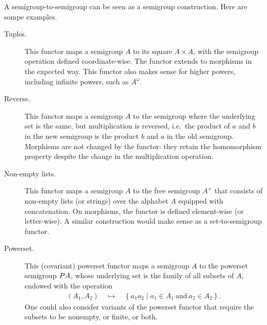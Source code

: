  \begin{example}\label{ex:functors}
 A semigroup-to-semigroup can be seen as a semigroup construction. Here are sompe examples.
 \begin{description}
 \item[Tuples.] This functor maps a semigroup $A$ to its square $A \times A$, with the semigroup operation defined coordinate-wise. The functor extends to morphisms in the expected way. This functor also makes sense for higher powers, including infinite powers, such as $A^\omega$.
 \item[Reverse.] This functor maps a semigroup $A$ to the semigroup where the underlying set is the same, but multiplication is reversed, i.e.~the product of $a$ and $b$ in the new semigroup is the product $b$ and $a$ in the old semigroup. Morphisms are not changed by the functor: they retain the homomorphism property despite the change in the multiplication operation.
 \item[Non-empty lists.] This functor maps a semigroup $A$ to the free semigroup $A^+$ that consists of non-empty lists (or strings) over the alphabet $A$ equipped with concatenation. On morphisms, the functor is defined element-wise (or letter-wise). A similar construction would make sense as a set-to-semigroup functor.
 \item[Powerset.] This (covariant) powerset functor maps a semigroup $A$ to the powerset semigroup $\powerset A$, whose underlying set is the family of all subsets of $A$, endowed with the operation
 \begin{align*}
 (A_1,A_2) \quad \mapsto \quad \left\{a_1 a_2 \mid a_1 \in A_1\ \text{and}\ a_2 \in A_2\right\}.
 \end{align*}
 One could also consider variants of the powerset functor that require the subsets to be nonempty, or finite, or both.
 \end{description}
 \end{example}

